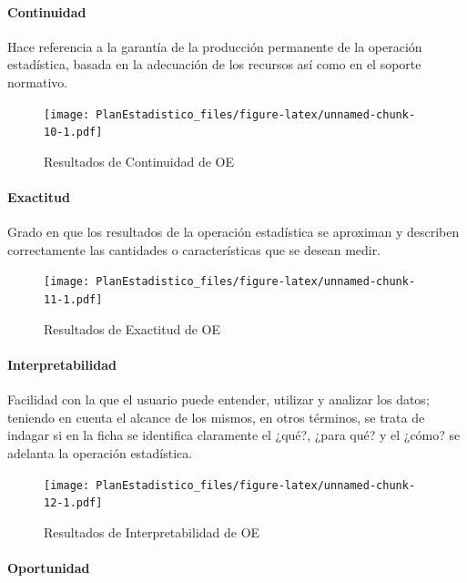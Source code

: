 \documentclass[
]{book}
\begin{document}
\hypertarget{continuidad}{%
\paragraph{Continuidad}\label{continuidad}}

Hace referencia a la garantía de la producción permanente de la operación
estadística, basada en la adecuación de los recursos así como en el soporte normativo.

\begin{figure}
\centering
\texttt{[image: PlanEstadistico\_files/figure-latex/unnamed-chunk-10-1.pdf]}
\caption{\label{fig:unnamed-chunk-10}Resultados de Continuidad de OE}
\end{figure}

\hypertarget{exactitud}{%
\paragraph{Exactitud}\label{exactitud}}

Grado en que los resultados de la operación estadística se aproximan y describen correctamente las cantidades o características que se desean medir.

\begin{figure}
\centering
\texttt{[image: PlanEstadistico\_files/figure-latex/unnamed-chunk-11-1.pdf]}
\caption{\label{fig:unnamed-chunk-11}Resultados de Exactitud de OE}
\end{figure}

\hypertarget{interpretabilidad}{%
\paragraph{Interpretabilidad}\label{interpretabilidad}}

Facilidad con la que el usuario puede entender, utilizar y analizar los datos;
teniendo en cuenta el alcance de los mismos, en otros términos, se trata de indagar si en la ficha
se identifica claramente el ¿qué?, ¿para qué? y el ¿cómo? se adelanta la operación estadística.

\begin{figure}
\centering
\texttt{[image: PlanEstadistico\_files/figure-latex/unnamed-chunk-12-1.pdf]}
\caption{\label{fig:unnamed-chunk-12}Resultados de Interpretabilidad de OE}
\end{figure}

\hypertarget{oportunidad}{%
\paragraph{Oportunidad}\label{oportunidad}}
\end{document}
